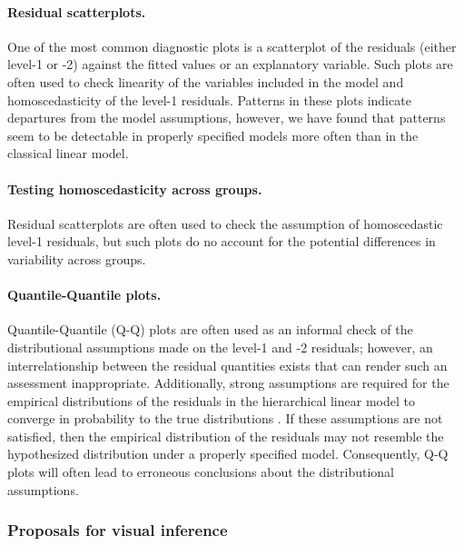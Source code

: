 \documentclass{article} %
\begin{document}
\paragraph{Residual scatterplots.} 
One of the most common diagnostic plots is a scatterplot of the residuals (either level-1 or -2) against the fitted values or an explanatory variable. Such plots are often used to check linearity of the variables included in the model and homoscedasticity of the level-1 residuals. Patterns in these plots indicate departures from the model assumptions, however, we have found that patterns seem to be detectable in properly specified models more often than in the classical linear model.

\paragraph{Testing homoscedasticity across groups.}
Residual scatterplots are often used to check the assumption of homoscedastic level-1 residuals, but such plots do no account for the potential differences in variability across groups. 

\paragraph{Quantile-Quantile plots.}
Quantile-Quantile (Q-Q) plots are often used as an informal check of the distributional assumptions made on the level-1 and -2 residuals; however, an interrelationship between the residual quantities exists that can render such an assessment inappropriate. Additionally, strong assumptions are required for the empirical distributions of the residuals in the hierarchical linear model to converge in probability to the true distributions \citep[Theorem 3.2 and Lemma 3.1]{Jiang:1998vt}. If these assumptions are not satisfied, then the empirical distribution of the residuals may not resemble the hypothesized distribution under a properly specified model. Consequently, Q-Q plots will often lead to erroneous conclusions about the distributional assumptions.


\subsubsection{Proposals for visual inference}



\end{document}
